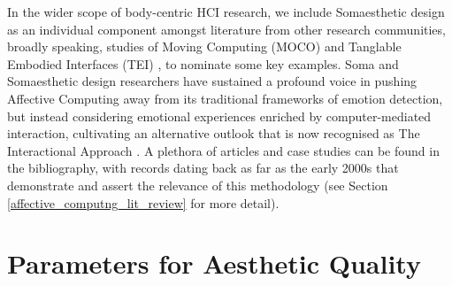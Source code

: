 In the wider scope of body-centric HCI research, we include Somaesthetic design as an individual component amongst literature from other research communities, broadly speaking, studies of Moving Computing (MOCO) \cite{zhou_dance_2021} and Tanglable Embodied Interfaces (TEI) \cite{li_meta-analysis_2022}, to nominate some key examples. Soma and Somaesthetic design researchers have sustained a profound voice in pushing Affective Computing away from its traditional frameworks of emotion detection, but instead considering emotional experiences enriched by computer-mediated interaction, cultivating an alternative outlook that is now recognised as The Interactional Approach \citep{hook_affective_2009}. A plethora of articles and case studies can be found in the bibliography, with records dating back as far as the early 2000s that demonstrate and assert the relevance of this methodology (see Section \ref{affective_computng_lit_review} for more detail).








\section{Parameters for Aesthetic Quality}
\label{cha:aestheitic_parameters}

